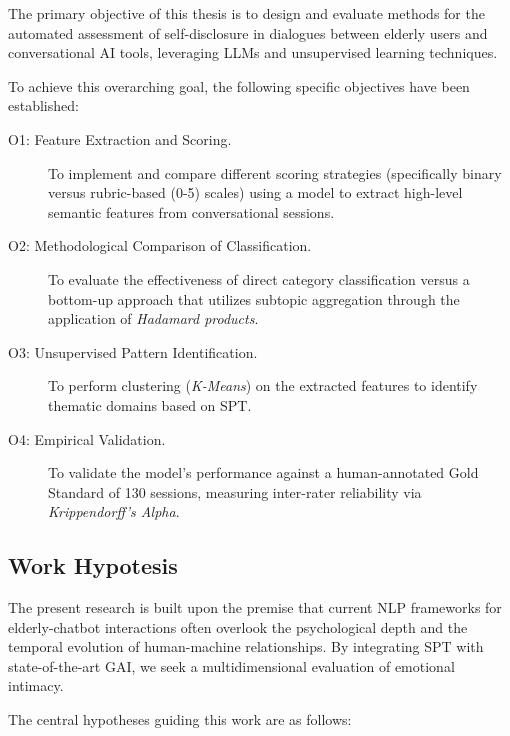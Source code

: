 The primary objective of this thesis is to design and evaluate methods for the automated assessment of self-disclosure in dialogues between elderly users and conversational AI tools, leveraging LLMs  and unsupervised learning techniques.

To achieve this overarching goal, the following specific objectives have been established:

\begin{description}
    \item[O1: Feature Extraction and Scoring.] To implement and compare different scoring strategies (specifically binary versus rubric-based (0-5) scales) using a model to extract high-level semantic features from conversational sessions.
    \item[O2: Methodological Comparison of Classification.] To evaluate the effectiveness of direct category classification versus a bottom-up approach that utilizes \gls{subtopic} aggregation through the application of \textit{Hadamard products}.
    \item[O3: Unsupervised Pattern Identification.] To perform clustering (\textit{K-Means}) on the extracted features to identify thematic domains based on SPT.
    \item[O4: Empirical Validation.] To validate the model's performance against a human-annotated \gls{Gold Standard} of 130 sessions, measuring inter-rater reliability via \textit{Krippendorff’s Alpha}.
\end{description}

\subsection{Work Hypotesis}

\label{sec:hypothesis}

The present research is built upon the premise that current NLP frameworks for elderly-chatbot interactions often overlook the psychological depth and the temporal evolution of human-machine relationships. By integrating SPT with state-of-the-art GAI, we seek 
a multidimensional evaluation of emotional intimacy.

The central hypotheses guiding this work are as follows:

